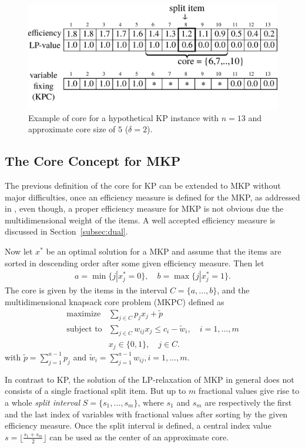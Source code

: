 \begin{figure}[h]
  \centering
  \includegraphics[scale=0.406]{imgs/kp_3}
  \caption{Example of core for a hypothetical KP instance with $n=13$ and approximate core size of $5$ ($\delta = 2$).}
  \label{fig:kpcore}
\end{figure}

\subsection{The Core Concept for MKP}

The previous definition of the core for KP can be extended to MKP without major
difficulties, once an efficiency measure is defined for the MKP,
as addressed in \cite{puchinger2006core}, even though,
a proper efficiency measure for MKP is not obvious due the
multidimensional weight of the items.
A well accepted efficiency measure is discussed in Section~\ref{subsec:dual}.

Now let $x^*$ be an optimal solution for a MKP and assume that the items are
sorted in descending order after some given efficiency measure. Then let
\begin{align}
  a = \min \{ j | x_j^* = 0 \}, \quad b = \max \{ j | x_j^* = 1 \}.
\end{align}
The core is given by the items in the interval $C = \{ a, \ldots, b \}$,
and the multidimensional knapsack core problem (MKPC) defined as
\begin{align}
  \text{maximize} & \sum_{j \in C} p_j x_j  + \tilde{p}\\
  \text{subject to} & \sum_{j \in C} w_{ij} x_j \leqslant c_i - \tilde{w}_i, \quad i = 1, \ldots, m\\
  & x_j \in \{0, 1\}, \quad j \in C.
\end{align}
with $\tilde{p} = \sum^{a-1}_{j=1} p_j$  and $\tilde{w}_i = \sum^{a-1}_{j=1} w_{ij}, i = 1, \ldots, m$.

In contrast to KP, the solution of the LP-relaxation of MKP in general does not
consists of a single fractional split item. But up to $m$ fractional values give
rise to a whole \emph{split interval} $S = \{ s_1, \ldots, s_m\}$, where
$s_1$ and $s_m$ are respectively the first and the last index of variables with
fractional values after sorting by the given efficiency measure.
Once the split interval is defined, a central index value $s = \lfloor \frac{s_1+s_m}{2}\rfloor$
can be used as the center of an approximate core.

